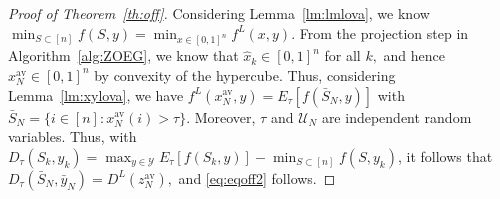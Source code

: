 \documentclass{article}
\theoremstyle{plain}
\theoremstyle{definition}
\theoremstyle{remark}
\begin{document}
\begin{proof}[Proof of Theorem~\ref{th:off}]
    Considering Lemma~\ref{lm:lmlova}, we know $\min_{S \subset [n]}f(S,y) = \min_{x\in[0,1]^n}f^L(x,y)$. From
    the projection step in Algorithm~\ref{alg:ZOEG}, we know that $\hat{x}_k\in[0,1]^n$ for all $k,$ and hence $x^{\mathrm{av}}_N\in[0,1]^n$ by convexity of the hypercube. Thus, considering Lemma~\ref{lm:xylova}, we have $f^L(x^{\mathrm{av}}_N,y) = E_\tau[f(\bar{S}_N,y)]$ with $\bar{S}_N=\{i\in[n]:x^{\mathrm{av}}_N(i)>\tau\}.$ Moreover, $\tau$ and $\mathcal{U}_N$ are independent random variables. Thus, with $D_\tau(S_k,y_k) = \max_{y\in\mathcal{Y}}E_\tau[f(S_k,y)]-\min_{S \subset [n]}f(S,y_k)$, it follows that $D_\tau(\bar{S}_N,\bar{y}_N)=D^L(z^{\mathrm{av}}_N),$ and \eqref{eq:eqoff2} follows.

    


\end{proof}
\end{document}
